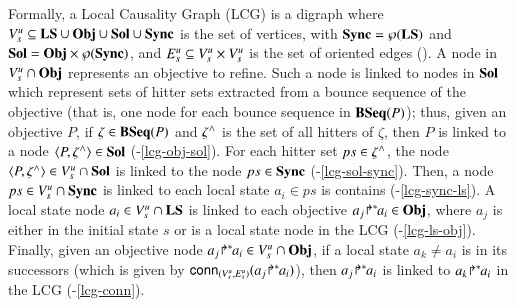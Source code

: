 Formally, a Local Causality Graph (LCG)
is a digraph where $V_s^u \subseteq \mathbf{LS}\cup \mathbf{Obj} \cup \mathbf{Sol} \cup \mathbf{Sync}$ is the set of vertices,
with $\mathbf{Sync}=\wp(\mathbf{LS})$ and $\mathbf{Sol}=\mathbf{Obj}\times\wp(\mathbf{Sync})$,
and $E_s^u \subseteq V_s^u \times V_s^u$ is the set of oriented edges
().
% 
A node in $V_s^u\cap\mathbf{Obj}$ represents an objective to refine.
Such a node is linked to nodes in $\mathbf{Sol}$ which represent
sets of hitter sets extracted from a
bounce sequence of the objective
(that is, one node for each bounce sequence in $\mathbf{BSeq}(P)$); thus,
given an objective $P$, if $\zeta\in\mathbf{BSeq}(P)$
and $\zeta^\wedge$ is the set of all hitters of $\zeta$,
then $P$ is linked to a node $\langle P, \zeta^\wedge\rangle\in\mathbf{Sol}$
(\nobreakdash-\ref{lcg-obj-sol}).
For each hitter set $ps\in\zeta^\wedge$,
the node $\langle P,\zeta^\wedge\rangle\in V_s^u\cap\mathbf{Sol}$ is
linked to the node $ps\in\mathbf{Sync}$
(\nobreakdash-\ref{lcg-sol-sync}).
Then, a node $ps\in V_s^u\cap\mathbf{Sync}$ is linked to each local state $a_i \in ps$ is contains
(\nobreakdash-\ref{lcg-sync-ls}).
A local state node $a_i\in V_s^u\cap\mathbf{LS}$
is linked to each objective ${a_j\!\Rsh^*\!\!a_i} \in \mathbf{Obj}$, where
$a_j$ is either in the initial state $s$ or
is a local state node in the LCG
(\nobreakdash-\ref{lcg-ls-obj}).
Finally, given an objective node ${a_j\!\Rsh^*\!\!a_i}\in V_s^u\cap\mathbf{Obj}$,
if a local state $a_k\neq a_i$ is in its successors (which is given by
$\mathsf{conn}_{({V_s^u},{E_s^u})}({a_j\!\Rsh^*\!\!a_i})$), then
${a_j\!\Rsh^*\!\!a_i}$ is linked to ${a_k\!\Rsh^*\!\!a_i}$ in the LCG
(\nobreakdash-\ref{lcg-conn}).

